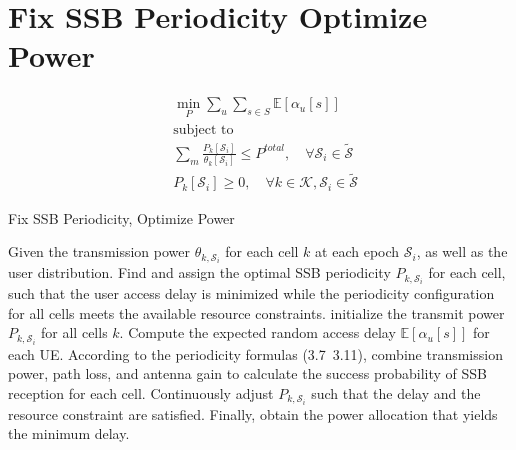 \section{Fix SSB Periodicity Optimize Power}

\begin{subequations} \label{eq:main}
\begin{align}
    &\min_{P} \sum_{u} \sum_{s\in S} \mathbb{E}[\alpha_u[s]] \\ 
    &\text{subject to} \nonumber \\
    &\sum_{m} \frac{P_{k}[\mathcal{S}_i]}{\theta_k[\mathcal{S}_i]} \leq P^{total}, \quad \forall \mathcal{S}_i \in \mathcal{\widetilde{S}}  \\ 
    &P_k[\mathcal{S}_i]\geq 0, \quad \forall k\in\mathcal{K}, \mathcal{S}_i\in\mathcal{\widetilde{S}}
\end{align}
\end{subequations}

\begin{algorithm}[H]
    \caption{Fix SSB Periodicity, Optimize Power}
    \label{alg:FSOP}
    \begin{algorithmic}[1]
        \REQUIRE{}
        Given the transmission power $\theta_{k,\mathcal{S}_i}$ for each cell $k$ at each epoch $\mathcal{S}_i$, as well as the user distribution.
        \ENSURE
        Find and assign the optimal SSB periodicity $P_{k, \mathcal{S}_i}$ for each cell, such that the user access delay is minimized while the periodicity configuration for all cells meets the available resource constraints.
        \STATE initialize the transmit power $P_{k, \mathcal{S}_i}$ for all cells $k$. 
        \STATE Compute the expected random access delay $\mathbb{E}[\alpha_u[s]]$ for each UE. 
        \STATE According to the periodicity formulas (3.7~3.11), combine transmission power, path loss, and antenna gain to calculate the success probability of SSB reception for each cell.
        \STATE Continuously adjust $P_{k, \mathcal{S}_i}$ such that the delay and the resource constraint are satisfied.
        \STATE Finally, obtain the power allocation that yields the minimum delay.
        \ENDFOR
    \end{algorithmic}
\end{algorithm}



